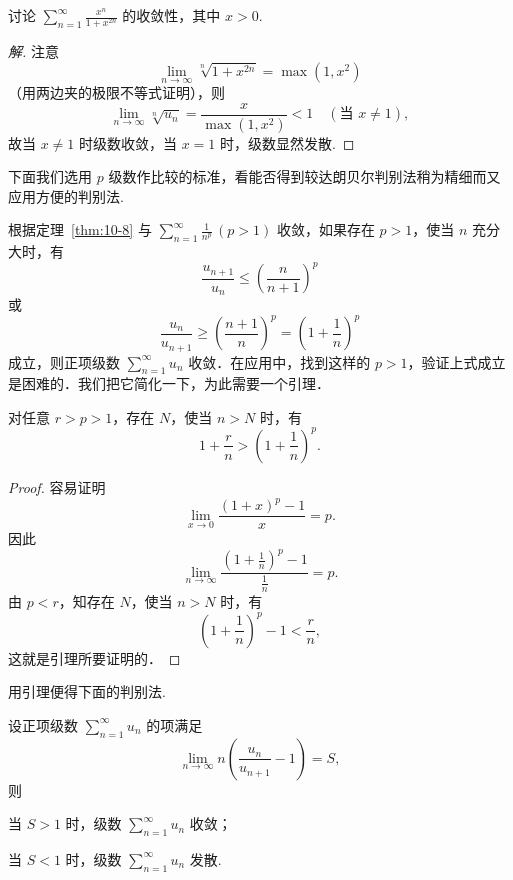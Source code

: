 \begin{example}\label{ex:10-3-6}
讨论 $\displaystyle\sum_{n=1}^{\infty}\frac{x^{n}}{1+x^{2n}}$ 的收敛性，其中 $x>0$.
\end{example}

\begin{proof}[解]
注意
\[
\lim_{n\to\infty}\sqrt[n]{1+x^{2n}}=\max(1,x^{2})
\]
（用两边夹的极限不等式证明），则
\[
\lim_{n\to\infty}\sqrt[n]{u_{n}}=\frac{x}{\max(1,x^{2})}<1\quad(\text{当 }x\neq1),
\]
故当 $x\neq1$ 时级数收敛，当 $x=1$ 时，级数显然发散.
\end{proof}

下面我们选用 $p$ 级数作比较的标准，看能否得到较达朗贝尔判别法稍为精细而又应用方便的判别法.

根据定理~\ref{thm:10-8} 与 $\sum_{n=1}^{\infty}\frac{1}{n^{p}}\,(p>1)$ 收敛，如果存在 $p>1$，使当 $n$ 充分大时，有
\[
\frac{u_{n+1}}{u_{n}}\leqslant\left(\frac{n}{n+1}\right)^{p}
\]
或
\[
\frac{u_{n}}{u_{n+1}}\geqslant\left(\frac{n+1}{n}\right)^{p}=\left(1+\frac{1}{n}\right)^{p}
\]
成立，则正项级数 $\sum_{n=1}^{\infty}u_{n}$ 收敛．在应用中，找到这样的 $p>1$，验证上式成立是困难的．我们把它简化一下，为此需要一个引理．

\begin{lemma*}
对任意 $r>p>1$，存在 $N$，使当 $n>N$ 时，有
\[
1+\frac{r}{n}>\left(1+\frac{1}{n}\right)^{p}.
\]
\end{lemma*}

\begin{proof}
容易证明
\[
\lim_{x\to0}\frac{(1+x)^{p}-1}{x}=p.
\]
因此
\[
\lim_{n\to\infty}\frac{\left(1+\frac{1}{n}\right)^{p}-1}{\frac{1}{n}}=p.
\]
由 $p<r$，知存在 $N$，使当 $n>N$ 时，有
\[
\left(1+\frac{1}{n}\right)^{p}-1<\frac{r}{n},
\]
这就是引理所要证明的．
\end{proof}

用引理便得下面的判别法.

\begin{theorem}\label{thm:10-11}
设正项级数 $\sum_{n=1}^{\infty}u_{n}$ 的项满足
\[
\lim_{n\to\infty}n\left(\frac{u_{n}}{u_{n+1}}-1\right)=S,
\]
则
\begin{ziti}
\item 当 $S>1$ 时，级数 $\sum_{n=1}^{\infty}u_{n}$ 收敛；
\item 当 $S<1$ 时，级数 $\sum_{n=1}^{\infty}u_{n}$ 发散.
\end{ziti}
\end{theorem}

